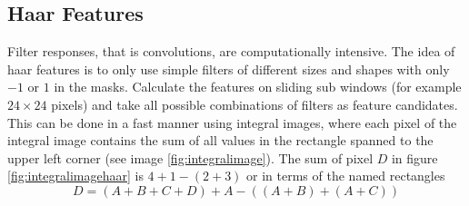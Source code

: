 \documentclass[x11names,11pt,a4paper]{article}
\theoremstyle{definition}
\begin{document}
\subsection{Haar Features}
Filter responses, that is convolutions, are computationally intensive. The idea of haar features is to only use simple filters of different sizes and shapes with only $-1$ or $1$ in the masks. Calculate the features on sliding sub windows (for example $24\times24$ pixels) and take all possible combinations of filters as feature candidates. This can be done in a fast manner using integral images, where each pixel of the integral image contains the sum of all values in the rectangle spanned to the upper left corner (see image \ref{fig:integralimage}). The sum of pixel $D$ in figure \ref{fig:integralimagehaar} is $4 + 1 - (2 + 3)$ or in terms of the named rectangles
\begin{equation*}
	D = (A+B+C+D) + A - ((A+B) + (A+C))
\end{equation*}
\end{document}
